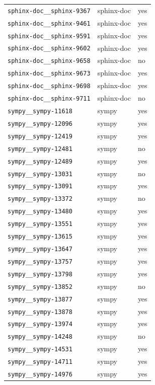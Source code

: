 \begin{longtable}{@{}p{}lp{}@{}}
\texttt{sphinx-doc\_\_sphinx-9367} & sphinx-doc & yes \\
\texttt{sphinx-doc\_\_sphinx-9461} & sphinx-doc & yes \\
\texttt{sphinx-doc\_\_sphinx-9591} & sphinx-doc & yes \\
\texttt{sphinx-doc\_\_sphinx-9602} & sphinx-doc & yes \\
\texttt{sphinx-doc\_\_sphinx-9658} & sphinx-doc & no \\
\texttt{sphinx-doc\_\_sphinx-9673} & sphinx-doc & yes \\
\texttt{sphinx-doc\_\_sphinx-9698} & sphinx-doc & yes \\
\texttt{sphinx-doc\_\_sphinx-9711} & sphinx-doc & no \\
\texttt{sympy\_\_sympy-11618} & sympy & yes \\
\texttt{sympy\_\_sympy-12096} & sympy & yes \\
\texttt{sympy\_\_sympy-12419} & sympy & yes \\
\texttt{sympy\_\_sympy-12481} & sympy & no \\
\texttt{sympy\_\_sympy-12489} & sympy & yes \\
\texttt{sympy\_\_sympy-13031} & sympy & no \\
\texttt{sympy\_\_sympy-13091} & sympy & yes \\
\texttt{sympy\_\_sympy-13372} & sympy & no \\
\texttt{sympy\_\_sympy-13480} & sympy & yes \\
\texttt{sympy\_\_sympy-13551} & sympy & yes \\
\texttt{sympy\_\_sympy-13615} & sympy & yes \\
\texttt{sympy\_\_sympy-13647} & sympy & yes \\
\texttt{sympy\_\_sympy-13757} & sympy & yes \\
\texttt{sympy\_\_sympy-13798} & sympy & yes \\
\texttt{sympy\_\_sympy-13852} & sympy & no \\
\texttt{sympy\_\_sympy-13877} & sympy & yes \\
\texttt{sympy\_\_sympy-13878} & sympy & yes \\
\texttt{sympy\_\_sympy-13974} & sympy & yes \\
\texttt{sympy\_\_sympy-14248} & sympy & no \\
\texttt{sympy\_\_sympy-14531} & sympy & yes \\
\texttt{sympy\_\_sympy-14711} & sympy & yes \\
\texttt{sympy\_\_sympy-14976} & sympy & yes \\

\end{longtable}
